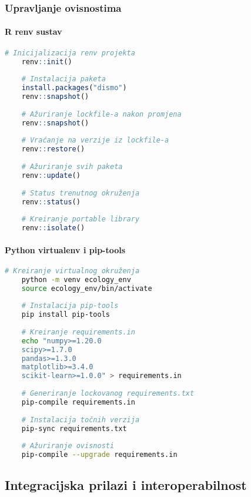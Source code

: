 \documentclass[11pt,oneside]{book}
\begin{document}
\subsubsection{Upravljanje ovisnostima}

\paragraph{R renv sustav}

\begin{lstlisting}[language=R, caption=Upravljanje R ovisnostima s renv]
	# Inicijalizacija renv projekta
	renv::init()
	
	# Instalacija paketa
	install.packages("dismo")
	renv::snapshot()
	
	# Ažuriranje lockfile-a nakon promjena
	renv::snapshot()
	
	# Vraćanje na verzije iz lockfile-a
	renv::restore()
	
	# Ažuriranje svih paketa
	renv::update()
	
	# Status trenutnog okruženja
	renv::status()
	
	# Kreiranje portable library
	renv::isolate()
\end{lstlisting}

\paragraph{Python virtualenv i pip-tools}

\begin{lstlisting}[language=bash, caption=Python dependency management]
	# Kreiranje virtualnog okruženja
	python -m venv ecology_env
	source ecology_env/bin/activate
	
	# Instalacija pip-tools
	pip install pip-tools
	
	# Kreiranje requirements.in
	echo "numpy>=1.20.0
	scipy>=1.7.0
	pandas>=1.3.0
	matplotlib>=3.4.0
	scikit-learn>=1.0.0" > requirements.in
	
	# Generiranje lockovanog requirements.txt
	pip-compile requirements.in
	
	# Instalacija točnih verzija
	pip-sync requirements.txt
	
	# Ažuriranje ovisnosti
	pip-compile --upgrade requirements.in
\end{lstlisting}

\subsection{Integracijska prilazi i interoperabilnost}
\end{document}
